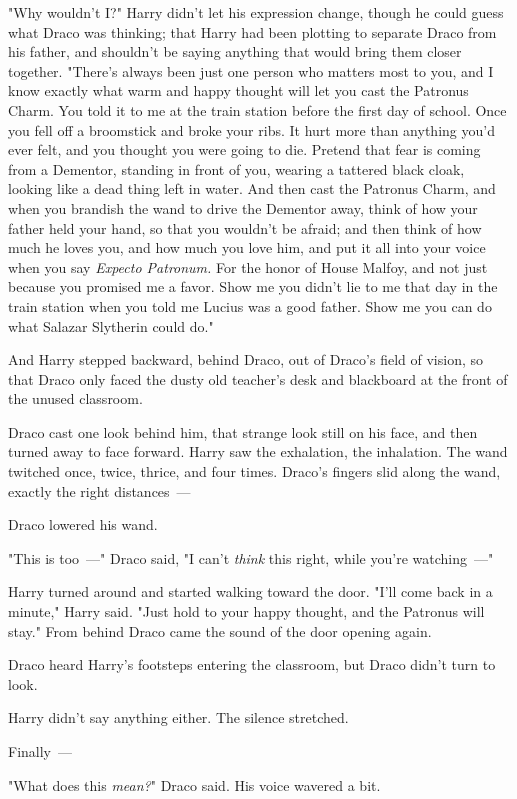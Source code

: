 "Why wouldn't I?" Harry didn't let his expression change, though he could guess
what Draco was thinking; that Harry had been plotting to separate Draco from
his father, and shouldn't be saying anything that would bring them closer
together. "There's always been just one person who matters most to you, and I
know exactly what warm and happy thought will let you cast the Patronus Charm.
You told it to me at the train station before the first day of school. Once you
fell off a broomstick and broke your ribs. It hurt more than anything you'd
ever felt, and you thought you were going to die. Pretend that fear is coming
from a Dementor, standing in front of you, wearing a tattered black cloak,
looking like a dead thing left in water. And then cast the Patronus Charm, and
when you brandish the wand to drive the Dementor away, think of how your father
held your hand, so that you wouldn't be afraid; and then think of how much he
loves you, and how much you love him, and put it all into your voice when you
say \emph{Expecto Patronum.} For the honor of House Malfoy, and not just
because you promised me a favor. Show me you didn't lie to me that day in the
train station when you told me Lucius was a good father. Show me you can do
what Salazar Slytherin could do."

And Harry stepped backward, behind Draco, out of Draco's field of vision, so
that Draco only faced the dusty old teacher's desk and blackboard at the front
of the unused classroom.

Draco cast one look behind him, that strange look still on his face, and then
turned away to face forward. Harry saw the exhalation, the inhalation. The wand
twitched once, twice, thrice, and four times. Draco's fingers slid along the
wand, exactly the right distances~---

Draco lowered his wand.

"This is too~---" Draco said, "I can't \emph{think} this right, while you're
watching~---"

Harry turned around and started walking toward the door. "I'll come back in a
minute," Harry said. "Just hold to your happy thought, and the Patronus will
stay."
\sbreak
From behind Draco came the sound of the door opening again.

Draco heard Harry's footsteps entering the classroom, but Draco didn't turn to
look.

Harry didn't say anything either. The silence stretched.

Finally~---

"What does this \emph{mean?}" Draco said. His voice wavered a bit.

